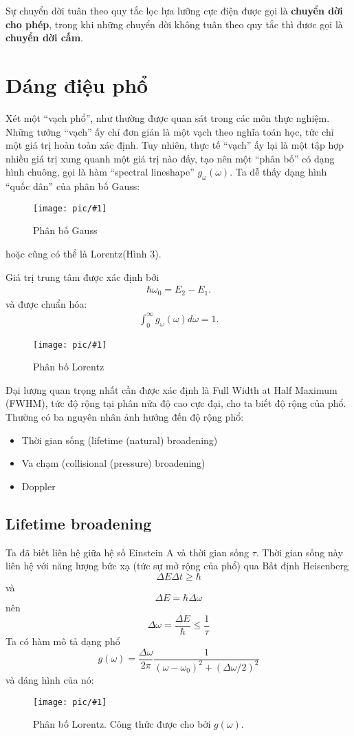 \documentclass{article}
\newcommand{\image}[2]{
	\begin{figure}[h!]
		\centering
		\texttt{[image: pic/\#1]}
		\caption{#2}
	\end{figure}
}
\begin{document}
Sự chuyển dời tuân theo quy tắc lọc lựa lưỡng cực điện được gọi là \textbf{chuyển dời cho phép}, trong khi những chuyển dời không tuân theo quy tắc thì đươc gọi là \textbf{chuyển dời cấm}.

\section{Dáng điệu phổ}

Xét một ``vạch phổ'', như thường được quan sát trong các môn thực nghiệm. Những tưởng ``vạch'' ấy chỉ đơn giản là một vạch theo nghĩa toán học, tức chỉ một giá trị hoàn toàn xác định. Tuy nhiên, thực tế ``vạch'' ấy lại là một tập hợp nhiều giá trị xung quanh một giá trị nào đấy, tạo nên một ``phân bố'' có dạng hình chuông, gọi là hàm ``spectral lineshape'' $g_\omega(\omega)$.
Ta dễ thấy dạng hình ``quốc dân'' của phân bố Gauss:
\image{gauss.jpg}{Phân bố Gauss}

hoặc cũng có thể là Lorentz(Hình 3).

Giá trị trung tâm được xác định bởi
\begin{align*}
	\hbar\omega_0 = E_2 - E_1.
\end{align*}
và được chuẩn hóa:
\begin{align*}
	\int_{0}^{\infty}g_\omega(\omega)d\omega = 1.
\end{align*}

\image{cauchy.png}{Phân bố Lorentz}

Đại lượng quan trọng nhất cần được xác định là Full Width at Half Maximum (FWHM), tức độ rộng tại phân nửa độ cao cực đại, cho ta biết độ rộng của phổ.\\
Thường có ba nguyên nhân ảnh hưởng đến độ rộng phổ:
\begin{itemize}
	\item Thời gian sống (lifetime (natural) broadening)
	\item Va chạm (collisional (pressure) broadening)
	\item Doppler
\end{itemize}
\subsection{Lifetime broadening}
Ta đã biết liên hệ giữa hệ số Einstein A và thời gian sống $\tau$. Thời gian sống này liên hệ với năng lượng bức xạ (tức sự mở rộng của phổ) qua Bất định Heisenberg $$\Delta E\Delta t \geq \hbar$$
và $$\Delta E = \hbar\Delta\omega$$
nên $$\Delta \omega=\frac{\Delta E}{\hbar} \leq \frac{1}{\tau}$$
Ta có hàm mô tả dạng phổ $$g(\omega) = \frac{\Delta\omega}{2\pi} \frac{1}{(\omega - \omega_0)^2 + (\Delta\omega/2)^2}$$
và dáng hình của nó:
\image{g(w).png}{Phân bố Lorentz. Công thức được cho bởi $g(\omega)$.}
\end{document}
